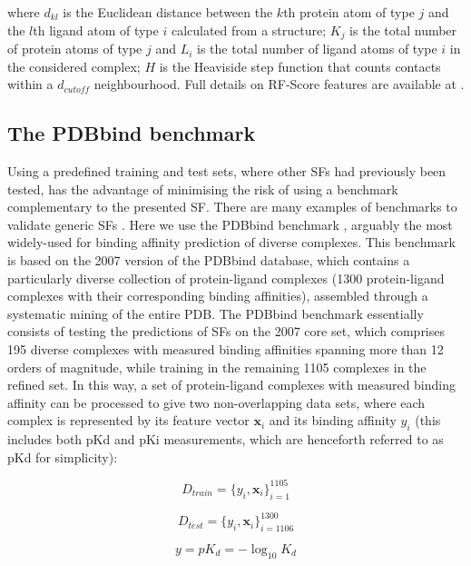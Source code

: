 where $d_{kl}$ is the Euclidean distance between the $k$th protein atom of type $j$ and the $l$th ligand atom of type $i$ calculated from a structure; $K_j$ is the total number of protein atoms of type $j$ and $L_i$ is the total number of ligand atoms of type $i$ in the considered complex; $H$ is the Heaviside step function that counts contacts within a $d_{cutoff}$ neighbourhood. Full details on RF-Score features are available at \citep{564}.

\subsection{The PDBbind benchmark}

Using a predefined training and test sets, where other SFs had previously been tested, has the advantage of minimising the risk of using a benchmark complementary to the presented SF. There are many examples of benchmarks to validate generic SFs \citep{1455,1456,571,1457}. Here we use the PDBbind benchmark \citep{1313}, arguably the most widely-used for binding affinity prediction of diverse complexes. This benchmark is based on the 2007 version of the PDBbind database, which contains a particularly diverse collection of protein-ligand complexes (1300 protein-ligand complexes with their corresponding binding affinities), assembled through a systematic mining of the entire PDB. The PDBbind benchmark essentially consists of testing the predictions of SFs on the 2007 core set, which comprises 195 diverse complexes with measured binding affinities spanning more than 12 orders of magnitude, while training in the remaining 1105 complexes in the refined set. In this way, a set of protein-ligand complexes with measured binding affinity can be processed to give two non-overlapping data sets, where each complex is represented by its feature vector $\mathbf x_i$ and its binding affinity $y_i$ (this includes both pKd and pKi measurements, which are henceforth referred to as pKd for simplicity):

\begin{equation}
\label{rfscore3:D_train}
D_{train}=\{y_i,\mathbf x_i\}_{i=1}^{1105}
\end{equation}

\begin{equation}
\label{rfscore3:D_test}
D_{test}=\{y_i,\mathbf x_i\}_{i=1106}^{1300}
\end{equation}

\begin{equation}
\label{rfscore3:y}
y=pK_d=-\log_{10}K_d
\end{equation}

